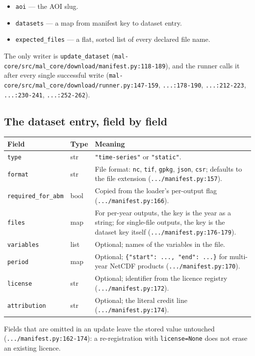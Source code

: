 \documentclass[11pt,a4paper]{article}
\newcommand{\code}[1]{\texttt{#1}}
\begin{document}
\begin{itemize}
\item \code{aoi} --- the AOI slug.
\item \code{datasets} --- a map from manifest key to dataset entry.
\item \code{expected\_files} --- a flat, sorted list of every declared file
name.
\end{itemize}

The only writer is \code{update\_dataset}
(\code{mal-core/src/mal\_core/download/manifest.py:118-189}), and the runner
calls it after every single successful write
(\code{mal-core/src/mal\_core/download/runner.py:147-159},
\code{...:178-190}, \code{...:212-223}, \code{...:230-241},
\code{...:252-262}).

\subsection{The dataset entry, field by field}

\begin{longtable}{@{}llp{}@{}}
\toprule
Field & Type & Meaning \\
\midrule
\endhead
\code{type} & str & \code{"time-series"} or \code{"static"}. \\
\code{format} & str & File format: \code{nc}, \code{tif}, \code{gpkg},
\code{json}, \code{csr}; defaults to the file extension
(\code{.../manifest.py:157}). \\
\code{required\_for\_abm} & bool & Copied from the loader's per-output flag
(\code{.../manifest.py:166}). \\
\code{files} & map & For per-year outputs, the key is the year as a string;
for single-file outputs, the key is the dataset key itself
(\code{.../manifest.py:176-179}). \\
\code{variables} & list & Optional; names of the variables in the file. \\
\code{period} & map & Optional; \code{\{"start": ..., "end": ...\}} for
multi-year NetCDF products (\code{.../manifest.py:170}). \\
\code{license} & str & Optional; identifier from the licence registry
(\code{.../manifest.py:172}). \\
\code{attribution} & str & Optional; the literal credit line
(\code{.../manifest.py:174}). \\
\bottomrule
\end{longtable}

Fields that are omitted in an update leave the stored value untouched
(\code{.../manifest.py:162-174}): a re-registration with \code{license=None}
does not erase an existing licence.
\end{document}
